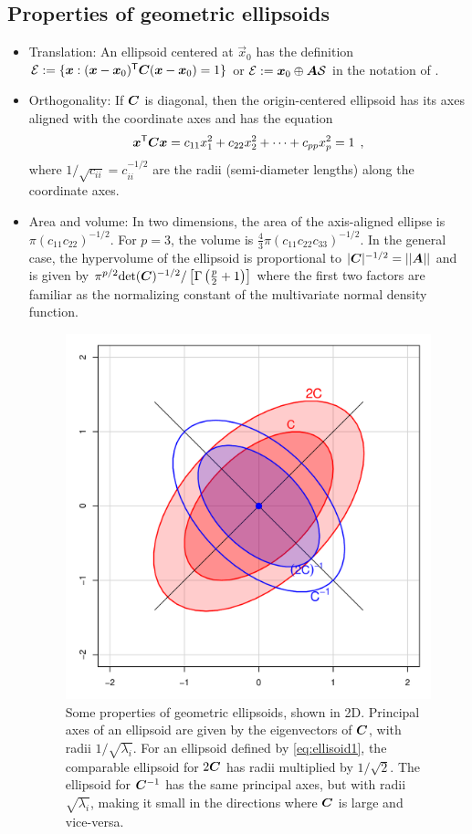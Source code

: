 \subsection{Properties of geometric ellipsoids}\label{sec:properties}

\begin{itemize}
 \item Translation: An ellipsoid centered at $\vec{x}_0$ has the definition $\mathcal{E} := \{ \bm{x}: (\bm{x}-\bm{x}_0)^\mathsf{T} \bm{C} (\bm{x}-\bm{x}_0) =1
 \}$ or $\mathcal{E} := \bm{x}_0 \oplus\bm{A} \mathcal{S}$ in the notation of .

 \item Orthogonality: If $\bm{C}$ is diagonal, then the origin-centered ellipsoid has its axes aligned with the coordinate axes and
has the equation
\begin{equation}\label{eq:ellisoid2}
 \bm{x}^\mathsf{T} \bm{C} \bm{x} = c_{11} x_1^2 + c_{22} x_2^2 + \cdots + c_{pp} x_p^2 =1 \:\: ,
\end{equation}
where $1/\sqrt{c_{ii}} = c_{ii}^{-1/2}$ are the radii (semi-diameter lengths) along the coordinate axes.

 \item Area and volume: In two dimensions, the area of the axis-aligned ellipse is $\pi (c_{11} c_{22})^{-1/2}$.
 For $p=3$, the volume is $\frac{4}{3}\pi (c_{11} c_{22} c_{33})^{-1/2}$.
 In the general case, the hypervolume of the ellipsoid is proportional to $|\bm{C}|^{-1/2}=||\bm{A}||$
 and is given by $\pi^{p/2} \mathrm{det} (\bm{C})^{-1/2} / \left[  \Gamma\left(\frac{p}{2}+1\right) \right]$
 \citep[\S 3.5]{Dempster:69}
 where the first two factors are familiar as the normalizing constant of the multivariate normal 
 density function.

\begin{figure}[tb]
  \centering
  \includegraphics[width=.5\textwidth,clip]{fig/inverse}
  \caption{Some properties of geometric ellipsoids, shown in 2D. Principal axes of an ellipsoid are given by the eigenvectors of
  $\bm{C}$, with radii $1/\sqrt{\lambda_i}$.  For an ellipsoid defined by \eqref{eq:ellisoid1},
  the comparable ellipsoid for $2\bm{C}$ has radii multiplied by $1/\sqrt{2}$.
  The ellipsoid for $\bm{C}^{-1}$ has the same principal axes, but with radii $\sqrt{\lambda_i}$, making it
  small in the directions where $\bm{C}$ is large and vice-versa.
  } \label{fig:inverse}
\end{figure}


\end{itemize}
